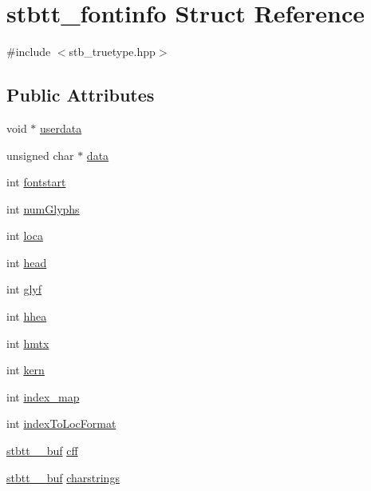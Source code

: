 \hypertarget{structstbtt__fontinfo}{}\section{stbtt\+\_\+fontinfo Struct Reference}
\label{structstbtt__fontinfo}


{\ttfamily \#include $<$stb\+\_\+truetype.\+hpp$>$}

\subsection*{Public Attributes}
\begin{DoxyCompactItemize}
\item 
void $\ast$ \hyperlink{structstbtt__fontinfo_a9c81078df96a7a3f730137151efab285}{userdata}
\item 
unsigned char $\ast$ \hyperlink{structstbtt__fontinfo_af348db379cf0e0e71a68603d00501d41}{data}
\item 
int \hyperlink{structstbtt__fontinfo_a139234d825b585afa27748a1f3d10c7d}{fontstart}
\item 
int \hyperlink{structstbtt__fontinfo_a60ad8301a98eb7cd91472ce846d9080d}{num\+Glyphs}
\item 
int \hyperlink{structstbtt__fontinfo_a15344195b181b50bde4f59ae7ca248c0}{loca}
\item 
int \hyperlink{structstbtt__fontinfo_ab76ed2f4cbd8fcbd8465ca5f88e7e2b9}{head}
\item 
int \hyperlink{structstbtt__fontinfo_a5de2129e0a415748920f6aa10ceee6e5}{glyf}
\item 
int \hyperlink{structstbtt__fontinfo_a91b82ae03d68892eb7f3fbd3a8b990e5}{hhea}
\item 
int \hyperlink{structstbtt__fontinfo_aebf42701e99b88d07a59bf99cb84b9a1}{hmtx}
\item 
int \hyperlink{structstbtt__fontinfo_a57cc83512daea60e97ed49354d634d37}{kern}
\item 
int \hyperlink{structstbtt__fontinfo_a0b95e3ac0c397b72b7696ce6696eb189}{index\+\_\+map}
\item 
int \hyperlink{structstbtt__fontinfo_a5fa117a7ef058111a70a5b0b87d220f4}{index\+To\+Loc\+Format}
\item 
\hyperlink{structstbtt____buf}{stbtt\+\_\+\+\_\+buf} \hyperlink{structstbtt__fontinfo_a6031b4bda94aa2b5ff07ef5d626a15a4}{cff}
\item 
\hyperlink{structstbtt____buf}{stbtt\+\_\+\+\_\+buf} \hyperlink{structstbtt__fontinfo_aaf04a69f8dd4b6a8bed4191b57145082}{charstrings}

\end{DoxyCompactItemize}
